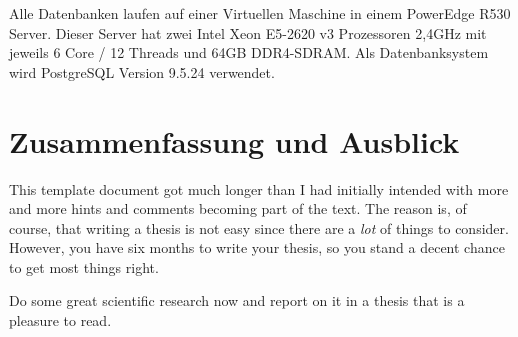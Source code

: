 \documentclass[german,version-2020-11]{uzl-thesis}
\begin{document}
Alle Datenbanken laufen auf einer Virtuellen Maschine in einem PowerEdge R530 Server. Dieser Server hat zwei Intel Xeon E5-2620 v3 Prozessoren 2,4GHz mit jeweils 6 Core / 12 Threads und 64GB DDR4-SDRAM. Als Datenbanksystem wird PostgreSQL Version 9.5.24 verwendet.

\chapter{Zusammenfassung und Ausblick}

%


This template document got much longer than I had initially intended
with more and more hints and comments becoming part of the text. The
reason is, of course, that writing a thesis is not easy since there
are a \emph{lot} of things to consider. However, you have six months
to write your thesis, so you stand a decent chance to get most things 
right.

Do some great scientific research now and report on it in a thesis
that is a pleasure to read. 


\listoftodos



%
\end{document}
